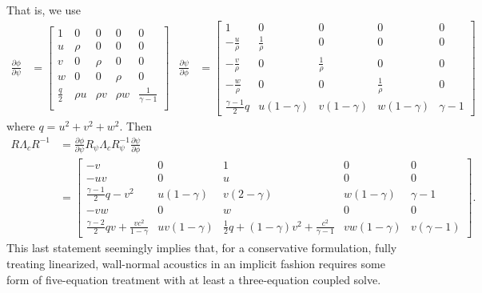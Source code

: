 \documentclass[letterpaper,11pt,nointlimits,reqno]{amsart}
\begin{document}
That is, we use
\begin{align}
  \frac{\partial \phi}{\partial \psi}
  &=
 \begin{bmatrix}
  1                      & 0      & 0      & 0      &  0                  \\
  u                      & \rho   & 0      & 0      &  0                  \\
  v                      & 0      & \rho   & 0      &  0                  \\
  w                      & 0      & 0      & \rho   &  0                  \\
  \frac{q}{2}  & \rho u & \rho v & \rho w &  \frac{1}{\gamma-1} \\
 \end{bmatrix}
&
  \frac{\partial \psi}{\partial \phi}
  &=
 \begin{bmatrix}
 1 & 0 & 0 & 0 & 0 \\
 -\frac{u}{\rho } & \frac{1}{\rho } & 0 & 0 & 0 \\
 -\frac{v}{\rho } & 0 & \frac{1}{\rho } & 0 & 0 \\
 -\frac{w}{\rho } & 0 & 0 & \frac{1}{\rho } & 0 \\
 \frac{\gamma-1}{2} q  & u(1-\gamma) & v(1-\gamma) & w(1-\gamma) & \gamma-1
 \end{bmatrix}
\end{align}
where $q=u^2+v^2+w^2$.  Then
\begin{align}
  R \Lambda_c R^{-1}
  &=
  \frac{\partial \phi}{\partial \psi}
  R_\psi \Lambda_c R_\psi^{-1}
  \frac{\partial \psi}{\partial \phi}
\\ \label{eq:cons}
 &=
\begin{bmatrix}
 -v & 0 & 1 & 0 & 0 \\
 -u v & 0 & u & 0 & 0 \\
 \frac{\gamma-1}{2}q -v^2 & u(1-\gamma)  & v(2-\gamma) & w(1-\gamma) & \gamma-1 \\
 -v w & 0 & w & 0 & 0 \\
 \frac{\gamma-2}{2} q v+\frac{v c^2}{1-\gamma} & u v (1-\gamma) & \frac{1}{2}q + (1-\gamma)v^2 + \frac{c^2}{\gamma-1} & v w (1-\gamma ) & v (\gamma-1)
\end{bmatrix}
.
\end{align}
This last statement seemingly implies that, for a conservative formulation,
fully treating linearized, wall-normal acoustics in an implicit fashion
requires some form of five-equation treatment with at least a three-equation
coupled solve.
\end{document}

